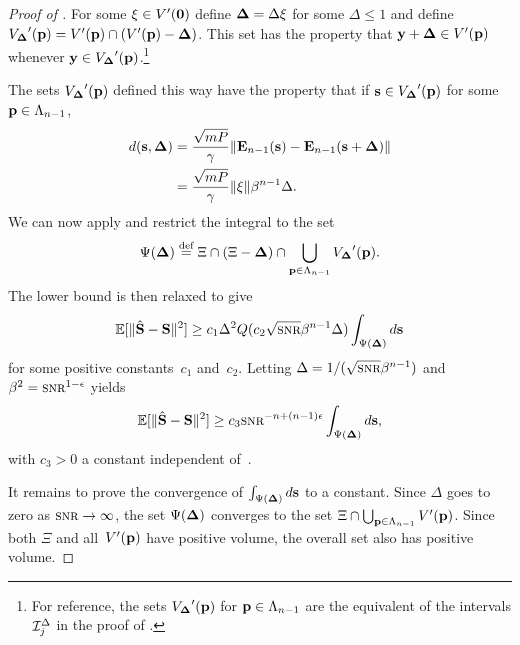 \begin{subappendices}
\begin{proof}[Proof of ]
    For some $\mathbf{\xi} \in V'(\mathbf{0})$ define $\mathbf{\Delta} = \Delta \mathbf{\xi}$ for some $\Delta \le
    1$ and define ${V_{\mathbf{\Delta}}}'(\mathbf{p}) = V'(\mathbf{p}) \cap (V'(\mathbf{p}) - \mathbf{\Delta})$. This set has the
    property that $\mathbf{y} + \mathbf{\Delta} \in V'(\mathbf{p})$ whenever $\mathbf{y} \in {V_{\mathbf{\Delta}}}'(\mathbf{p})$.\footnote{For
    reference, the sets ${V_{\mathbf{\Delta}}}'(\mathbf{p})$ for $\mathbf{p} \in {\Lambda_{n-1}}$ are the equivalent of the
    intervals $\mathcal{I}_j^{\Delta}$ in the proof of .}

    The sets ${V_{\mathbf{\Delta}}}'(\mathbf{p})$ defined this way have the property that if $\mathbf{s} \in
    {V_{\mathbf{\Delta}}}'(\mathbf{p})$ for some $\mathbf{p} \in {\Lambda_{n-1}}$,
    \begin{align*}
      d(\mathbf{s},\mathbf{\Delta}) &= \frac{\sqrt{mP}}{\gamma} \| \mathbf{E}_{n-1}(\mathbf{s}) - \mathbf{E}_{n-1}(\mathbf{s} +
      \mathbf{\Delta}) \| \\
      &= \frac{\sqrt{mP}}{\gamma} \| \mathbf{\xi} \| \beta^{n-1} \Delta.
    \end{align*}
    We can now apply  and restrict the integral to the set
    \[ \Psi(\mathbf{\Delta}) \stackrel{\text{def}}{=} \Xi \cap (\Xi - \mathbf{\Delta}) \cap \bigcup_{\mathbf{p} \in {\Lambda_{n-1}}} {V_{\mathbf{\Delta}}}'(\mathbf{p}).
    \]
    The lower bound is then relaxed to give
    \begin{equation*}
      \msev \ge c_1 \Delta^2 Q(c_2 \sqrt{\snr} \beta^{n-1} \Delta) 
      \int_{\Psi(\Dv)} d\s
    \end{equation*}
    for some positive constants~$c_1$ and~$c_2$. Letting $\Delta =
    1/(\sqrt{\snr} \beta^{n-1})$ and $\beta^2 = \snr^{1-\e}$ yields
    \begin{equation*}
      \msev \ge c_3 \snr^{-n+(n-1)\e} \int_{\Psi(\Dv)} d\s,
    \end{equation*}
    with $c_3 > 0$ a constant independent of~\snr.

    It remains to prove the convergence of $\int_{\Psi(\mathbf{\Delta})} d\mathbf{s}$ to a constant.
    Since $\Delta$ goes to zero as $\snr \goesto \infty$, the set $\Psi(\mathbf{\Delta})$
    converges to the set $\Xi \cap \bigcup_{\mathbf{p} \in {\Lambda_{n-1}}} V'(\mathbf{p})$. Since both
    $\Xi$ and all~$V'(\mathbf{p})$ have positive volume, the overall set also has
    positive volume.
  \end{proof}



\end{subappendices}
